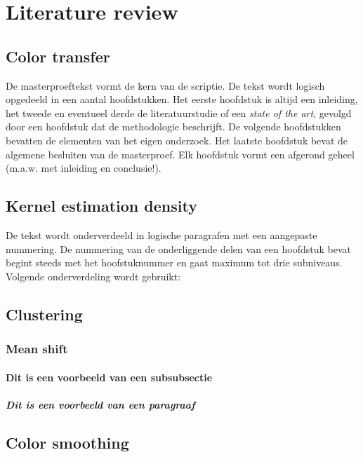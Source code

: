 
\chapter{Literature review}

\section{Color transfer}
De masterproeftekst vormt de kern van de scriptie. De tekst wordt logisch opgedeeld in een aantal hoofdstukken. Het eerste hoofdstuk is altijd een inleiding, het tweede en eventueel derde de literatuurstudie of een \textit{state of the art}, gevolgd door een hoofdstuk dat de methodologie beschrijft. De volgende hoofdstukken bevatten de elementen van het eigen onderzoek. Het laatste hoofdstuk bevat de algemene besluiten van de masterproef. Elk hoofdstuk vormt een afgerond geheel (m.a.w. met inleiding en conclusie!).

\section{Kernel estimation density}
De tekst wordt onderverdeeld in logische paragrafen met een aangepaste nummering. De nummering van de onderliggende delen van een hoofdstuk bevat begint steeds met het hoofstuknummer en gaat maximum tot drie subniveaus. 
Volgende onderverdeling wordt gebruikt:

\section{Clustering}
\subsection{Mean shift}

\subsubsection{Dit is een voorbeeld van een subsubsectie}
\paragraph{Dit is een voorbeeld van een paragraaf}

\section{Color smoothing}